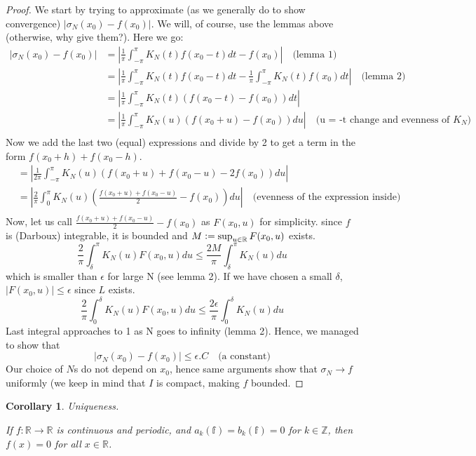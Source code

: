 \documentclass[12pt]{amsart}
\newtheorem{corollary}[theorem]{Corollary}
\theoremstyle{definition}
\begin{document}
\begin{proof}
We start by trying to approximate (as we generally do to show convergence) $|\sigma_N(x_0) - f(x_0)|$. We will, of course, use the lemmas above (otherwise, why give them?). Here we go:
\begin{align*}
|\sigma_N(x_0) - f(x_0)| &= \left|\frac{1}{\pi} \int_{-\pi}^{\pi} K_N(t)f(x_0-t)dt - f(x_0)\right| \quad\text{(lemma 1)} \\
&= \left|\frac{1}{\pi} \int_{-\pi}^{\pi} K_N(t)f(x_0-t)dt - \frac{1}{\pi} \int_{-\pi}^{\pi} K_N(t)f(x_0)dt\right| \quad\text{(lemma 2)} \\
&= \left|\frac{1}{\pi} \int_{-\pi}^{\pi} K_N(t)(f(x_0-t) - f(x_0))dt \right|\\
&= \left|\frac{1}{\pi} \int_{-\pi}^{\pi} K_N(u)(f(x_0+u) - f(x_0))du \right| \quad\text{(u = -t change and evenness of $K_N$)}\\
\end{align*}
Now we add the last two (equal) expressions and divide by 2 to get a term in the form $f(x_0 + h) + f(x_0 - h)$.
\begin{align*}
    &= \left|\frac{1}{2\pi} \int_{-\pi}^{\pi} K_N(u)(f(x_0+u) + f(x_0 - u) - 2f(x_0))du \right| \\
    &= \left|\frac{2}{\pi} \int_{0}^{\pi} K_N(u)(\frac{f(x_0+u) + f(x_0 - u)}{2} - f(x_0))du \right| \quad\text{(evenness of the expression inside)}\\
\end{align*}
Now, let us call $\frac{f(x_0+u) + f(x_0 - u)}{2} - f(x_0)$ as $F(x_0,u)$ for simplicity. since \(f\) is (Darboux) integrable, it is bounded and $M \vcentcolon = \sup_{u \in \mathbb{R}} F(x_0,u)$ exists.
\[
\frac{2}{\pi} \int_{\delta}^{\pi} K_N(u)F(x_0,u)du \leq \frac{2M}{\pi} \int_{\delta}^{\pi} K_N(u)du
\]
which is smaller than $\epsilon$ for large N (see lemma 2). If we have chosen a small $\delta$, $|F(x_0, u)| \leq \epsilon$ since $L$ exists.
\[
\frac{2}{\pi} \int_{0}^{\delta} K_N(u)F(x_0,u)du \leq \frac{2\epsilon}{\pi} \int_{0}^{\delta} K_N(u)du
\]
Last integral approaches to 1 as N goes to infinity (lemma 2). Hence, we managed to show that
\[
|\sigma_N(x_0) - f(x_0)| \leq \epsilon . C \quad\text{(a constant)}
\]
Our choice of $N$s do not depend on $x_0$, hence same arguments show that $\sigma_N \to f$ uniformly (we keep in mind that $I$ is compact, making \(f\) bounded.
\end{proof}


\begin{corollary}{Uniqueness. \footnotemark{}

}

If $f : \mathbb{R} \to \mathbb{R}$ is continuous and periodic, and $a_k(\mathbb{f}) = b_k(\mathbb{f}) = 0$ for $k \in \mathbb{Z}$, then $f(x) = 0$ for all $x \in \mathbb{R}$.
\end{corollary}
\end{document}
